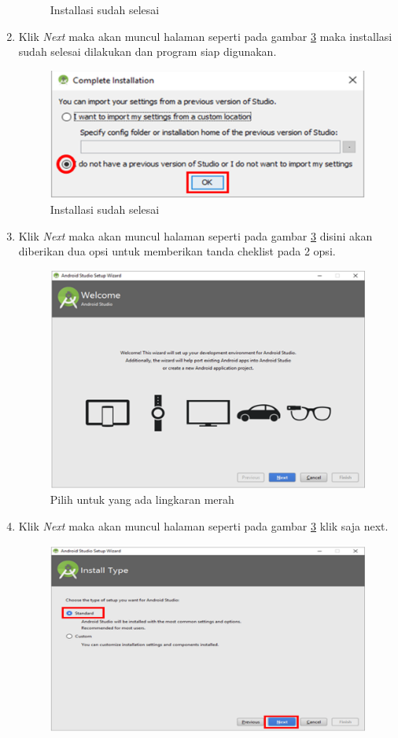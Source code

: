 \begin{enumerate}
\begin{figure}[!htbp]
  		 \caption{Installasi sudah selesai}\label{fig:done}
		 \end{figure}
		 \item Klik \textit{Next} maka akan muncul halaman seperti pada gambar \ref{fig:done} maka installasi sudah selesai dilakukan dan program siap digunakan.
		 \begin{figure}[!htbp]
  		 \centering
 		 \includegraphics[width=.75\textwidth]{figures/In12.png}
  		 \caption{Installasi sudah selesai}\label{fig:done}
		 \end{figure}
		 \item Klik \textit{Next} maka akan muncul halaman seperti pada gambar \ref{fig:done} disini akan diberikan dua opsi untuk memberikan tanda cheklist pada 2 opsi.
		 \begin{figure}[!htbp]
  		 \centering
 		 \includegraphics[width=.75\textwidth]{figures/In13.png}
  		 \caption{Pilih untuk yang ada lingkaran merah}\label{fig:done}
		 \end{figure}
		 \item Klik \textit{Next} maka akan muncul halaman seperti pada gambar \ref{fig:done} klik saja next.
		 \begin{figure}[!htbp]
  		 \centering
 		 \includegraphics[width=.75\textwidth]{figures/In14.png}

\end{figure}
\end{enumerate}

